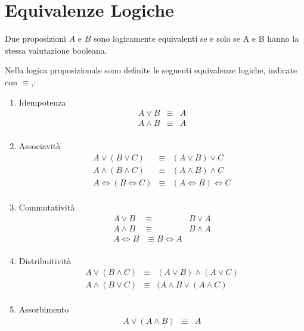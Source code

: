 
\section{Equivalenze Logiche}
Due proposizioni $A$ e $B$ sono logicamente equivalenti se e solo se A e B hanno
la stessa valutazione booleana.

Nella logica proposizionale sono definite le seguenti equivalenze logiche, indicate con $\equiv$,:
\begin{enumerate}
    \item Idempotenza
            \begin{align*}
                A \lor B & \equiv & A \\
                A \land B & \equiv & A \\
            \end{align*}
    \item Associavità
            \begin{align*}
                A \lor (B \lor C) & \equiv & (A \lor B) \lor C \\
                A \land (B \land C) & \equiv & (A \land B) \land C \\
                A \iff (B \iff C) & \equiv & (A \iff B) \iff C \\
            \end{align*}
    \item Commutatività
            \begin{align*}
                A \lor B & \equiv & B \lor A \\
                A \land B & \equiv & B \land A \\
                A \iff B & \equiv B \iff A \\
            \end{align*}
    \item Distribuitività
            \begin{align*}
                A \lor (B \land C) & \equiv & (A \lor B) \land (A \lor C)\\
                A \land (B \lor C) & \equiv & (A \land B \lor (A \land C) \\
            \end{align*}
    \item Assorbimento
            \begin{align*}
                A \lor (A \land B) & \equiv & A \\

\end{align*}
\end{enumerate}
